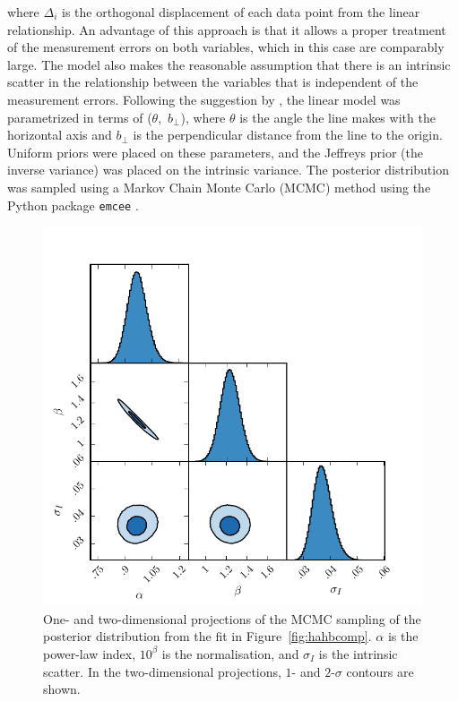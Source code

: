 \noindent where $\Delta_i$ is the orthogonal displacement of each data point from the linear relationship. 
An advantage of this approach is that it allows a proper treatment of the measurement errors on both variables, which in this case are comparably large.
The model also makes the reasonable assumption that there is an intrinsic scatter in the relationship between the variables that is independent of the measurement errors.  
Following the suggestion by \citet{hogg10}, the linear model was parametrized in terms of ($\theta$,~$b_\bot$), where $\theta$ is the angle the line makes with the horizontal axis and $b_\bot$ is the perpendicular distance from the line to the origin.
Uniform priors were placed on these parameters, and the Jeffreys prior (the inverse variance) was placed on the intrinsic variance. 
The posterior distribution was sampled using a Markov Chain Monte Carlo (MCMC) method using the Python package {\tt emcee} \citep{foreman13}. 

\begin{figure}[h!]
    \centering
    \includegraphics[width=0.8\columnwidth]{figures/chapter03/ha_hb_mcmc_parameters.pdf} 
    \caption[{One- and two-dimensional projections of the MCMC sampling of the posterior distribution from the fit in Figure~\ref{fig:hahbcomp}.}]{One- and two-dimensional projections of the MCMC sampling of the posterior distribution from the fit in Figure~\ref{fig:hahbcomp}. $\alpha$ is the power-law index, $10^\beta$ is the normalisation, and $\sigma_I$ is the intrinsic scatter. In the two-dimensional projections, $1$- and $2$-$\sigma$ contours are shown.} 
    \label{fig:ha_hb_mcmc_samples}
\end{figure}

